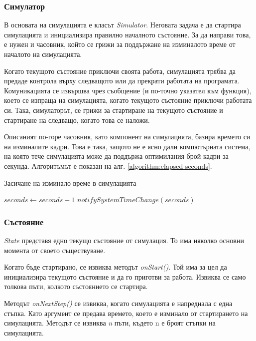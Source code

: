 		\newpage
		
		\subsubsection{Симулатор}		
		
		В основата на симулацията е класът \emph{Simulator}. Неговата задача е да стартира симулацията
		и инициализира правилно началното състояние. За да направи това, е нужен и часовник, който се грижи
		за поддържане на изминалото време от началото на симулацията. 
		
		Когато текущото състояние приключи своята работа, симулацията трябва да предаде контрола върху следващото или да прекрати работата
		на програмата. Комуникацията се извършва чрез съобщение (и по-точно указател към функция), което
		се изпраща на симулацията, когато текущото състояние приключи работата си. Така, симулаторът,
		се грижи за стартиране на текущото състояние и стартиране на следващо, когато това се наложи.
		
		Описаният по-горе часовник, като компонент на симулацията, базира времето си
		на изминалите кадри. Това е така, защото не е ясно дали компютърната система,
		на която тече симулацията може да поддържа оптимилания брой кадри за секунда.
		Алгоритъмът е показан на алг. \ref{algorithm:elapsed-seconds}.

		\begin{algorithm}				
			\caption{Засичане на изминало време в симулацията}				
			\label{algorithm:elapsed-seconds}
			\begin{algorithmic}
					\State $seconds\gets seconds+1$
					\State $notifySystemTimeChange(seconds)$
				\EndIf
			\end{algorithmic}
		\end{algorithm}
		
		\subsubsection{Състояние}					
		
			\emph{State} представя едно текущо състояние от симулация. То има няколко основни момента от своето съществуване.
			 
			Когато бъде стартирано, се извиква методът \emph{onStart()}. Той има за цел да инициализира текущото състояние и да го приготви за работа.
			Извиква се само толкова пъти, колкото състоянието се стартира. 
			
			Методът \emph{onNextStep()} се извиква, когато симулацията е напреднала 
			с една стъпка. Като аргумент се предава времето, което е изминало от стартирането на симулацията. 
			Методът се извиква \emph{n} пъти, където n е броят стъпки на симулацията. 
			
